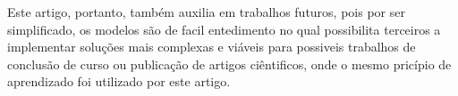\documentclass[12pt]{article}
\begin{document}
Este artigo, portanto, também auxilia em trabalhos futuros, pois por ser simplificado, os modelos são de facil entedimento no qual possibilita terceiros a implementar soluções mais complexas e viáveis para possiveis trabalhos de conclusão de curso ou publicação de artigos ciêntificos, onde o mesmo pricípio de aprendizado foi utilizado por este artigo.


\end{document}
